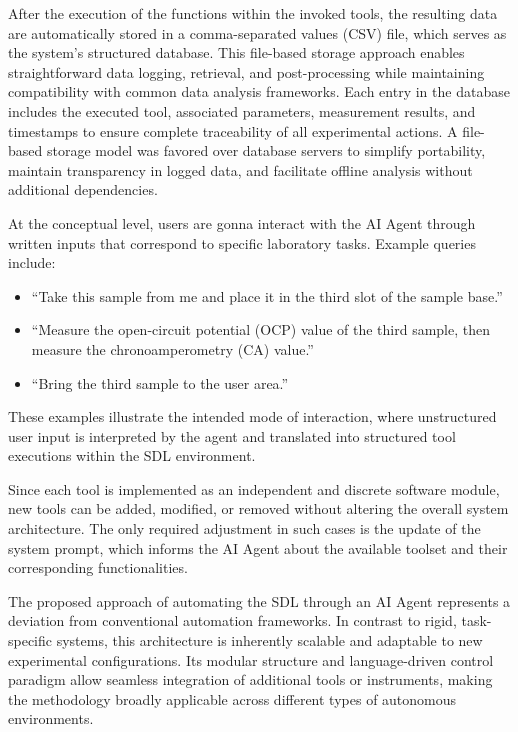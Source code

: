 After the execution of the functions within the invoked tools, the resulting data are automatically stored in a comma-separated values (CSV) file, which serves as the system’s structured database. This file-based storage approach enables straightforward data logging, retrieval, and post-processing while maintaining compatibility with common data analysis frameworks. Each entry in the database includes the executed tool, associated parameters, measurement results, and timestamps to ensure complete traceability of all experimental actions. A file-based storage model was favored over database servers to simplify portability, maintain transparency in logged data, and facilitate offline analysis without additional dependencies.

At the conceptual level, users are gonna interact with the AI Agent through written inputs that correspond to specific laboratory tasks. Example queries include:

\begin{itemize}
    \item ``Take this sample from me and place it in the third slot of the sample base.''
    \item ``Measure the open-circuit potential (OCP) value of the third sample, then measure the chronoamperometry (CA) value.''
    \item ``Bring the third sample to the user area.''
\end{itemize}

These examples illustrate the intended mode of interaction, where unstructured user input is interpreted by the agent and translated into structured tool executions within the SDL environment.

Since each tool is implemented as an independent and discrete software module, new tools can be added, modified, or removed without altering the overall system architecture. The only required adjustment in such cases is the update of the system prompt, which informs the AI Agent about the available toolset and their corresponding functionalities.

The proposed approach of automating the SDL through an AI Agent represents a deviation from conventional automation frameworks. In contrast to rigid, task-specific systems, this architecture is inherently scalable and adaptable to new experimental configurations. Its modular structure and language-driven control paradigm allow seamless integration of additional tools or instruments, making the methodology broadly applicable across different types of autonomous environments.


